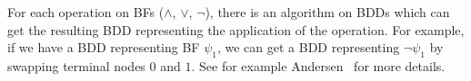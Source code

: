 \documentclass[
  digital, %
  twoside, %
  table,   %
  nolof,     %
  nolot,     %
]{fithesis3}
\theoremstyle{definition}
\newtheorem{example}{Example}
\theoremstyle{remark}
\begin{document}





For each operation on BFs (${\land}$, ${\lor}$, ${\neg}$), there is an algorithm on BDDs which can get the resulting BDD representing the application of the operation. For example, if we have a BDD representing BF $\psi_1$, we can get a BDD representing $\neg \psi_1$ by swapping terminal nodes $0$ and $1$. See for example Andersen~\cite{BDDdetails} for more details. %


\end{document}
